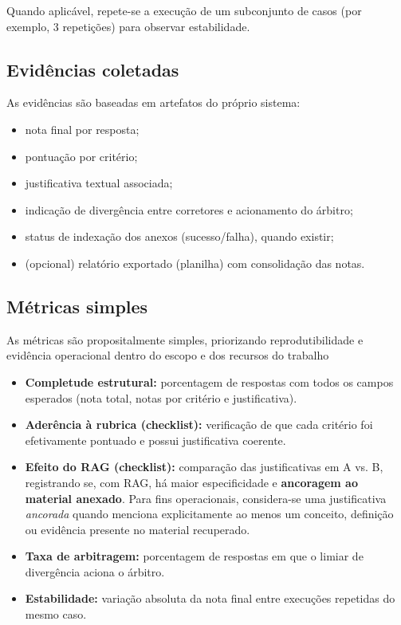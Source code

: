 Quando aplicável, repete-se a execução de um subconjunto de casos (por exemplo, 3 repetições) para observar estabilidade.

\subsection{Evidências coletadas}
As evidências são baseadas em artefatos do próprio sistema:

\begin{itemize}
    \item nota final por resposta;
    \item pontuação por critério;
    \item justificativa textual associada;
    \item indicação de divergência entre corretores e acionamento do árbitro;
    \item status de indexação dos anexos (sucesso/falha), quando existir;
    \item (opcional) relatório exportado (planilha) com consolidação das notas.
\end{itemize}

\subsection{Métricas simples}
As métricas são propositalmente simples, priorizando reprodutibilidade e evidência operacional dentro do escopo e dos recursos do trabalho  

\begin{itemize}
    \item \textbf{Completude estrutural:} porcentagem de respostas com todos os campos esperados (nota total, notas por critério e justificativa).
    \item \textbf{Aderência à rubrica (checklist):} verificação de que cada critério foi efetivamente pontuado e possui justificativa coerente.
    \item \textbf{Efeito do RAG (checklist):} comparação das justificativas em A vs. B, registrando se, com RAG, há maior especificidade e \textbf{ancoragem ao material anexado}. Para fins operacionais, considera-se uma justificativa \textit{ancorada} quando menciona explicitamente ao menos um conceito, definição ou evidência presente no material recuperado.
    \item \textbf{Taxa de arbitragem:} porcentagem de respostas em que o limiar de divergência aciona o árbitro.
    \item \textbf{Estabilidade:} variação absoluta da nota final entre execuções repetidas do mesmo caso.
\end{itemize}

